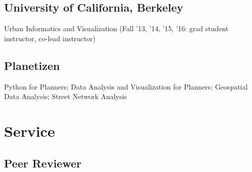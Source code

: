 \documentclass[12pt,letterpaper]{report}
\newcommand{\listitemspace}{0.15em}
\renewenvironment{itemize}
{\begin{list}{}{\setlength{\leftmargin}{0em}
			\setlength{\parskip}{0em}
			\setlength{\itemsep}{\listitemspace}
			\setlength{\parsep}{\listitemspace}}}
	{\end{list}}
\begin{document}
	\subsection*{University of California, Berkeley}
	
	\begin{itemize}
		
		\item Urban Informatics and Visualization (Fall '13, '14, '15, '16: grad student instructor, co-lead instructor)
		
	\end{itemize}
	
	\subsection*{Planetizen}
	
	\begin{itemize}
		
		\item Python for Planners; Data Analysis and Visualization for Planners; Geospatial Data Analysis; Street Network Analysis
		
	\end{itemize}
	
	
	\section*{Service}
	
	\subsection*{Peer Reviewer}
	
\end{document}

